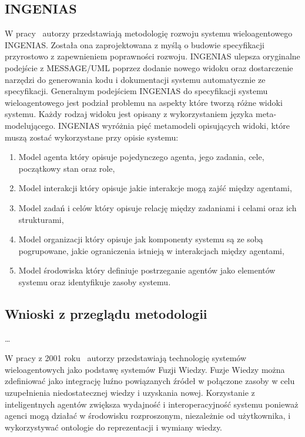 \documentclass[11pt]{report}
\begin{document}
    \subsection{INGENIAS}
    W pracy~\cite{Pavon2003} autorzy przedstawiają metodologię rozwoju systemu wieloagentowego INGENIAS.
    Została ona zaprojektowana z myślą o budowie specyfikacji przyrostowo z zapewnieniem poprawności rozwoju.
    INGENIAS ulepsza oryginalne podejście z MESSAGE/UML poprzez dodanie nowego widoku oraz dostarczenie narzędzi do generowania kodu i dokumentacji systemu automatycznie ze specyfikacji.
    Generalnym podejściem INGENIAS do specyfikacji systemu wieloagentowego jest podział problemu na aspekty które tworzą różne widoki systemu.
    Każdy rodzaj widoku jest opisany z wykorzystaniem języka meta-modelującego.
    INGENIAS wyróżnia pięć metamodeli opisujących widoki, które muszą zostać wykorzystane przy opisie systemu:
    \begin{enumerate}
        \item Model agenta który opisuje pojedynczego agenta, jego zadania, cele, początkowy stan oraz role,
        \item Model interakcji który opisuje jakie interakcje mogą zajść między agentami,
        \item Model zadań i celów który opisuje relację między zadaniami i celami oraz ich strukturami,
        \item Model organizacji który opisuje jak komponenty systemu są ze sobą pogrupowane, jakie ograniczenia istnieją w interakcjach między agentami,
        \item Model środowiska który definiuje postrzeganie agentów jako elementów systemu oraz identyfikuje zasoby systemu.
    \end{enumerate}

    \subsection{Wnioski z przeglądu metodologii}
    \ldots


    W pracy z 2001 roku~\cite{Smirnov2002} autorzy przedstawiają technologię systemów wieloagentowych jako podstawę systemów Fuzji Wiedzy.
    Fuzje Wiedzy można zdefiniować jako integrację luźno powiązanych źródeł w połączone zasoby w celu uzupełnienia niedostatecznej wiedzy i uzyskania nowej.
    Korzystanie z inteligentnych agentów zwiększa wydajność i interoperacyjność systemu ponieważ agenci mogą działać w środowisku rozproszonym, niezależnie od użytkownika, i wykorzystywać
    ontologie do reprezentacji i wymiany wiedzy.
\end{document}
